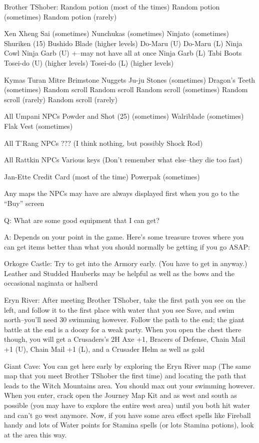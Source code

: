 \documentclass[12pt]{article}
\begin{document}
Brother TShober: Random potion (most of the times) Random potion
(sometimes) Random potion (rarely)

Xen Xheng Sai (sometimes) Nunchukas (sometimes) Ninjato (sometimes)
Shuriken (15) Bushido Blade (higher levels) Do-Maru (U) Do-Maru (L)
Ninja Cowl \textbar{} Ninja Garb (U) +--may not have all at once Ninja
Garb (L) \textbar{} Tabi Boots \textbar{} Tosei-do (U) (higher levels)
Tosei-do (L) (higher levels)

Kymas Turan Mitre Brimstone Nuggets Ju-ju Stones (sometimes) Dragon's
Teeth (sometimes) Random scroll Random scroll Random scroll (sometimes)
Random scroll (rarely) Random scroll (rarely)

All Umpani NPCs Powder and Shot (25) (sometimes) Walriblade (sometimes)
Flak Vest (sometimes)

All T'Rang NPCs ??? (I think nothing, but possibly Shock Rod)

All Rattkin NPCs Various keys (Don't remember what else--they die too
fast)

Jan-Ette Credit Card (most of the time) Powerpak (sometimes)

Any maps the NPCs may have are always displayed first when you go to the
``Buy'' screen

Q: What are some good equipment that I can get?

A: Depends on your point in the game. Here's some treasure troves where
you can get items better than what you should normally be getting if you
go ASAP:

Orkogre Castle: Try to get into the Armory early. (You have to get in
anyway.) Leather and Studded Hauberks may be helpful as well as the bows
and the occasional naginata or halberd

Eryn River: After meeting Brother TShober, take the first path you see
on the left, and follow it to the first place with water that you see
Save, and swim north--you'll need 30 swimming however. Follow the path
to the end; the giant battle at the end is a doozy for a weak party.
When you open the chest there though, you will get a Crusaders's 2H Axe
+1, Bracers of Defense, Chain Mail +1 (U), Chain Mail +1 (L), and a
Crusader Helm as well as gold

Giant Cave: You can get here early by exploring the Eryn River map (The
same map that you meet Brother TShober the first time) and locating the
path that leads to the Witch Mountains area. You should max out your
swimming however. When you enter, crack open the Journey Map Kit and as
west and south as possible (you may have to explore the entire west
area) until you both hit water and can't go west anymore. Now, if you
have some area effect spells like Fireball handy and lots of Water
points for Stamina spells (or lots Stamina potions), look at the area
this way.
\end{document}

